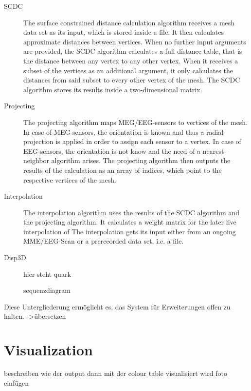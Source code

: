 \documentclass[a4paper, 11pt, ngerman, fleqn]{article}
\begin{document}
\begin{description}
	
	\item[SCDC] 
	The surface constrained distance calculation algorithm receives a mesh data set as its input, which is stored inside a file. It then calculates approximate distances between vertices. When no further input arguments are provided, the SCDC algorithm calculates a full distance table, that is the distance between any vertex to any other vertex.
	When it receives a subset of the vertices as an additional argument, it only calculates the distances from said subset to every other vertex of the mesh. The SCDC algorithm stores its results inside a two-dimensional matrix.
	
	\item[Projecting]
	The projecting algorithm maps MEG/EEG-sensors to vertices of the mesh. In case of MEG-sensors, the orientation is known and thus a radial projection is applied in order to assign each sensor to a vertex. In case of EEG-sensors, the orientation is not know and the need of a nearest-neighbor algorithm arises.
	The projecting algorithm then outputs the results of the calculation as an array of indices, which point to the respective vertices of the mesh.
	
	\item[Interpolation]
	The interpolation algorithm uses the results of the SCDC algorithm and the projecting algorithm.
	It calculates a weight matrix for the later live interpolation of 
	The interpolation gets its input either from an ongoing MME/EEG-Scan or a prerecorded data set, i.e. a file. 
	
	\item[Disp3D]
	hier steht quark
	

sequenzdiagram
	
\end{description}

Diese Untergliederung ermöglicht es, das System für Erweiterungen offen zu halten. ->übersetzen


\clearpage


\section{Visualization}
beschreiben wie der output dann mit der colour table visualisiert wird
foto einfügen



\clearpage
  
\end{document}

